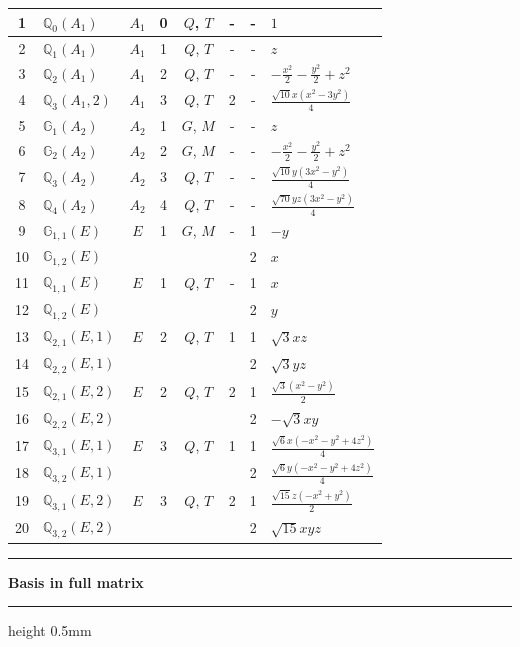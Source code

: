 \documentclass[fleqn,10pt,landscape]{jsarticle}
\begin{document}
\begin{longtable}[l]{clcccccl}
1 & $\mathbb{Q}_{0}(A_{1})$ & $A_{1}$ & 0 & $Q$, $T$ & - & - & $1$ \\ \hline
2 & $\mathbb{Q}_{1}(A_{1})$ & $A_{1}$ & 1 & $Q$, $T$ & - & - & $z$ \\ \hline
3 & $\mathbb{Q}_{2}(A_{1})$ & $A_{1}$ & 2 & $Q$, $T$ & - & - & $- \frac{x^{2}}{2} - \frac{y^{2}}{2} + z^{2}$ \\ \hline
4 & $\mathbb{Q}_{3}(A_{1},2)$ & $A_{1}$ & 3 & $Q$, $T$ & 2 & - & $\frac{\sqrt{10} x \left(x^{2} - 3 y^{2}\right)}{4}$ \\ \hline
5 & $\mathbb{G}_{1}(A_{2})$ & $A_{2}$ & 1 & $G$, $M$ & - & - & $z$ \\ \hline
6 & $\mathbb{G}_{2}(A_{2})$ & $A_{2}$ & 2 & $G$, $M$ & - & - & $- \frac{x^{2}}{2} - \frac{y^{2}}{2} + z^{2}$ \\ \hline
7 & $\mathbb{Q}_{3}(A_{2})$ & $A_{2}$ & 3 & $Q$, $T$ & - & - & $\frac{\sqrt{10} y \left(3 x^{2} - y^{2}\right)}{4}$ \\ \hline
8 & $\mathbb{Q}_{4}(A_{2})$ & $A_{2}$ & 4 & $Q$, $T$ & - & - & $\frac{\sqrt{70} y z \left(3 x^{2} - y^{2}\right)}{4}$ \\ \hline
9 & $\mathbb{G}_{1,1}(E)$ & $E$ & 1 & $G$, $M$ & - & 1 & $- y$ \\
10 & $\mathbb{G}_{1,2}(E)$ &  &  &  &  & 2 & $x$ \\ \hline
11 & $\mathbb{Q}_{1,1}(E)$ & $E$ & 1 & $Q$, $T$ & - & 1 & $x$ \\
12 & $\mathbb{Q}_{1,2}(E)$ &  &  &  &  & 2 & $y$ \\ \hline
13 & $\mathbb{Q}_{2,1}(E,1)$ & $E$ & 2 & $Q$, $T$ & 1 & 1 & $\sqrt{3} x z$ \\
14 & $\mathbb{Q}_{2,2}(E,1)$ &  &  &  &  & 2 & $\sqrt{3} y z$ \\ \hline
15 & $\mathbb{Q}_{2,1}(E,2)$ & $E$ & 2 & $Q$, $T$ & 2 & 1 & $\frac{\sqrt{3} \left(x^{2} - y^{2}\right)}{2}$ \\
16 & $\mathbb{Q}_{2,2}(E,2)$ &  &  &  &  & 2 & $- \sqrt{3} x y$ \\ \hline
17 & $\mathbb{Q}_{3,1}(E,1)$ & $E$ & 3 & $Q$, $T$ & 1 & 1 & $\frac{\sqrt{6} x \left(- x^{2} - y^{2} + 4 z^{2}\right)}{4}$ \\
18 & $\mathbb{Q}_{3,2}(E,1)$ &  &  &  &  & 2 & $\frac{\sqrt{6} y \left(- x^{2} - y^{2} + 4 z^{2}\right)}{4}$ \\ \hline
19 & $\mathbb{Q}_{3,1}(E,2)$ & $E$ & 3 & $Q$, $T$ & 2 & 1 & $\frac{\sqrt{15} z \left(- x^{2} + y^{2}\right)}{2}$ \\
20 & $\mathbb{Q}_{3,2}(E,2)$ &  &  &  &  & 2 & $\sqrt{15} x y z$ \\
\end{longtable}
\vspace{5mm}
\noindent \rule[0.5mm]{5mm}{0.5mm}\hspace{3mm}\textbf{Basis in full matrix}\hspace{3mm}\leaders\hrule height 0.5mm\hfill\kern0pt
\vspace{3mm}
\end{document}
